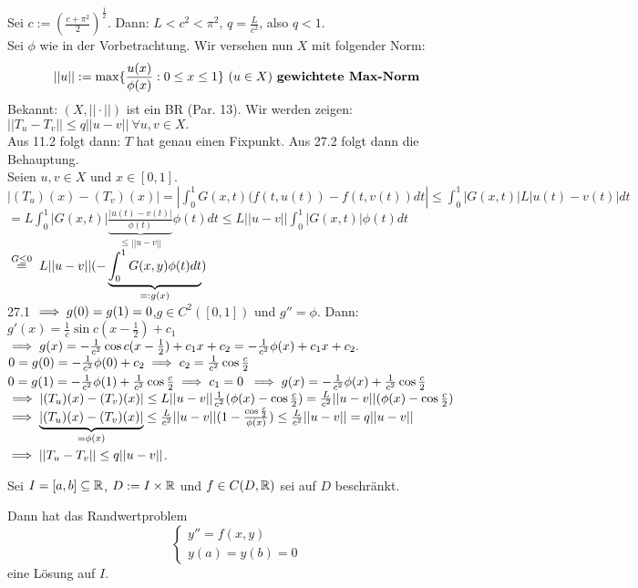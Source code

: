 \documentclass[a4paper,twoside,DIV15,BCOR12mm]{scrbook}
\begin{document}
\begin{beweis}
Sei $c:=(\frac{c+\pi^2}{2})^{\frac{1}{2}}$. Dann: $L<c^2<\pi^2$, $q=\frac{L}{c^2}$, also $q<1$.\\
Sei $\phi$ wie in der Vorbetrachtung. Wir versehen nun $X$ mit folgender Norm:
$$ ||u|| := \max\{\frac{u(x)}{\phi(x)}:0\le x\le 1\}\ (u \in X) \text{ \begriff{gewichtete Max-Norm}}$$
Bekannt: $(X,||\cdot||)$ ist ein BR (Par. 13). Wir werden zeigen: \\
$||T_u-T_v||\le q||u-v||\ \forall u,v \in X.$\\
Aus 11.2 folgt dann: $T$ hat genau einen Fixpunkt. Aus 27.2 folgt dann die Behauptung.\\
Seien $u,v \in X$ und $x\in[0,1]$.
$|(T_u)(x)-(T_v)(x)|=|\int_0^1G(x,t)(f(t,u(t))-f(t,v(t))dt|\le\int_0^1|G(x,t)|L|u(t)-v(t)|dt$\\
$=L\int_0^1|G(x,t)|\underbrace{\frac{|u(t)-v(t)|}{\phi(t)}}_{ \le||u-v||}\phi(t)dt \le L||u-v||\int_0^1|G(x,t)|\phi(t)dt$\\
$\gleichwegen{G\le0} L||u-v||(-\underbrace{\int_0^1G(x,y)\phi(t)dt}_{=:g(x)})$\\
27.1 $\implies g(0)=g(1)=0$,$g\in C^2([0,1])$ und $g''=\phi$. Dann: $g'(x)=\frac{1}{c}\sin{c(x-\frac{1}{2})}+c_1$\\
$\implies g(x) = -\frac{1}{c^2}\cos{c(x-\frac{1}{2})}+c_1x+c_2=-\frac{1}{c^2}\phi(x)+c_1x+c_2.$\\
$0=g(0)=-\frac{1}{c^2}\phi(0)+c_2 \implies c_2 = \frac{1}{c^2}\cos{\frac{c}{2}}$
$0=g(1)=-\frac{1}{c^2}\phi(1)+\frac{1}{c^2}\cos{\frac{c}{2}} \implies c_1 = 0$
$\implies g(x)=-\frac{1}{c^2}\phi(x)+\frac{1}{c^2}\cos{\frac{c}{2}}$\\
$\implies |(T_u)(x)-(T_v)(x)|\le L||u-v|| \frac{1}{c^2}(\phi(x)-\cos{\frac{c}{2}}) = \frac{L}{c^2}||u-v||(\phi(x)-\cos{\frac{c}{2}})$
$\implies \underbrace{|(T_u)(x)-(T_v)(x)|}_{=\phi(x)}\le \frac{L}{c^2}||u-v||(1-\frac{\cos{\frac{c}{2}}}{\phi(x)})\le\frac{L}{c^2}||u-v||=q||u-v||$\\
$\implies ||T_u-T_v||\le q||u-v||$.
\end{beweis}

\begin{satz}
Sei $I=[a,b]\subseteq \mathbb{R}$, $D:= I\times \mathbb{R}$ und $f\in C(D,\mathbb{R})$ sei auf $D$ beschränkt.

Dann hat das Randwertproblem
\[ \begin{cases} y'' = f(x,y) \\ y(a) = y(b) = 0 \end{cases} \]
eine Lösung auf $I$.
\end{satz}
\end{document}
